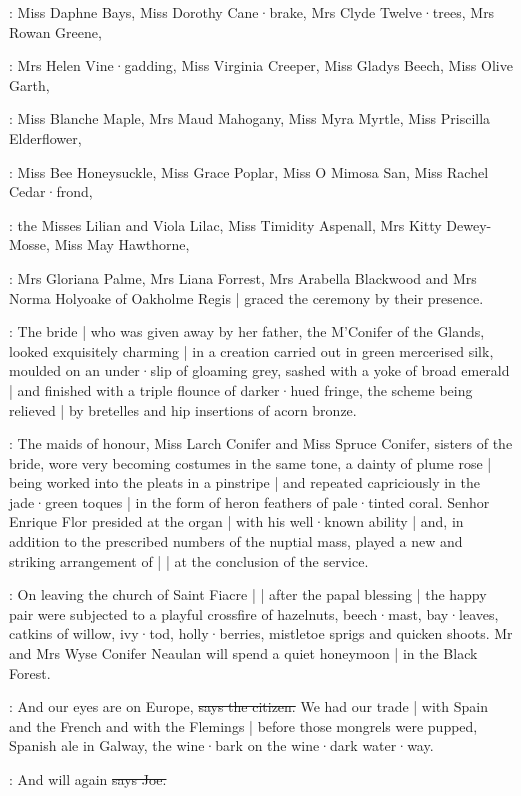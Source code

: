 :
Miss Daphne Bays,
Miss Dorothy Cane·brake,
Mrs Clyde Twelve·trees,
Mrs Rowan Greene,

:
Mrs Helen Vine·gadding,
Miss Virginia Creeper,
Miss Gladys Beech,
Miss Olive Garth,

:
Miss Blanche Maple,
Mrs Maud Mahogany,
Miss Myra Myrtle,
Miss Priscilla Elderflower,

:
Miss Bee Honeysuckle,
Miss Grace Poplar,
Miss O Mimosa San,
Miss Rachel Cedar·frond,

:
the Misses Lilian and Viola Lilac,
Miss Timidity Aspenall,
Mrs Kitty Dewey-Mosse,
Miss May Hawthorne,

:
Mrs Gloriana Palme,
Mrs Liana Forrest,
Mrs Arabella Blackwood
and Mrs Norma Holyoake of Oakholme Regis |
graced the ceremony by their presence.

:
The bride |
who was given away by her father,
the M'Conifer of the Glands,
looked exquisitely charming |
in a creation carried out in green mercerised silk,
moulded on an under·slip of gloaming grey,
sashed with a yoke of broad emerald |
and finished with a triple flounce of darker·hued fringe,
the scheme being relieved |
by bretelles and hip insertions of acorn bronze.

:
The maids of honour,
Miss Larch Conifer and Miss Spruce Conifer,
sisters of the bride,
wore very becoming costumes in the same tone,
a dainty  of plume rose |
being worked into the pleats in a pinstripe |
and repeated capriciously in the jade·green toques |
in the form of heron feathers of pale·tinted coral.
Senhor Enrique Flor presided at the organ |
with his well·known ability |
and,
in addition to the prescribed numbers of the nuptial mass,
played a new and striking arrangement of
 |
 |
at the conclusion of the service.

:
On leaving the church of Saint Fiacre |
 |
after the papal blessing |
the happy pair were subjected to a playful crossfire of hazelnuts,
beech·mast,
bay·leaves,
catkins of willow,
ivy·tod,
holly·berries,
mistletoe sprigs
and quicken shoots.
Mr and Mrs Wyse Conifer Neaulan will spend a quiet honeymoon |
in the Black Forest.

\citizen:
And our eyes are on Europe,
\sout{says the citizen.}
We had our trade |
with Spain and the French and with the Flemings |
before those mongrels were pupped,
Spanish ale in Galway,
the wine·bark on the wine·dark water·way.

\joe:
And will again
\sout{says Joe.}


